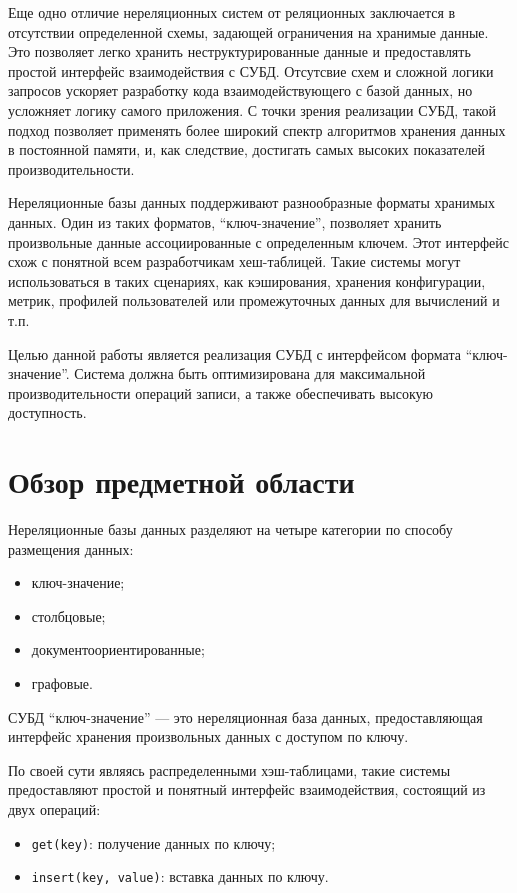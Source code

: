 \documentclass[14pt, russian]{scrartcl}
\begin{document}
Еще одно отличие нереляционных систем от реляционных заключается в отсутствии
определенной схемы, задающей ограничения на хранимые данные. Это позволяет легко
хранить неструктурированные данные и предоставлять простой интерфейс
взаимодействия с СУБД. Отсутсвие схем и сложной логики запросов ускоряет
разработку кода взаимодействующего с базой данных, но усложняет логику самого
приложения. С точки зрения реализации СУБД, такой подход позволяет применять
более широкий спектр алгоритмов хранения данных в постоянной памяти, и, как
следствие, достигать самых высоких показателей производительности.

Нереляционные базы данных поддерживают разнообразные форматы хранимых данных.
Один из таких форматов, ``ключ-значение'', позволяет хранить произвольные данные
ассоциированные с определенным ключем. Этот интерфейс схож с понятной всем
разработчикам хеш-таблицей. Такие системы могут использоваться в таких
сценариях, как кэширования, хранения конфигурации, метрик, профилей
пользователей или промежуточных данных для вычислений и т.п.

Целью данной работы является реализация СУБД с интерфейсом формата
``ключ-значение''. Система должна быть оптимизирована для максимальной
производительности операций записи, а также обеспечивать высокую доступность.

\section{Обзор предметной области}

Нереляционные базы данных разделяют на четыре категории по способу размещения
данных\cite{corbellini2017persisting}:

\begin{itemize}
  \item ключ-значение;
  \item столбцовые;
  \item документоориентированные;
  \item графовые.
\end{itemize}

СУБД ``ключ-значение'' --- это нереляционная база данных, предоставляющая
интерфейс хранения произвольных данных с доступом по ключу.

По своей сути являясь распределенными хэш-таблицами, такие системы предоставляют
простой и понятный интерфейс взаимодействия, состоящий из двух операций:

\begin{itemize}
  \item \verb|get(key)|: получение данных по ключу;
  \item \verb|insert(key, value)|: вставка данных по ключу.
\end{itemize}
\end{document}
